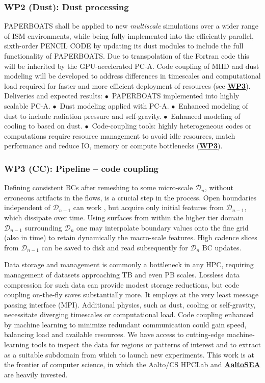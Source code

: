 \documentclass[a4paper,12pt]{article}
\newcommand{\wpdef}[3]{\hypertarget{wp#1}{\subsubsection*{WP#1 {\normalfont(#2)}: #3}}}
\newcommand{\wpref}[1]{\protect\hyperlink{wp#1}{\textbf{WP#1}}}
\begin{document}
\wpdef{2}{Dust}{Dust processing}
\vspace{-0.3cm}
\textsc{PAPERBOATS} shall be applied to new \textit{multiscale} simulations
over a wider range of ISM environments, while being fully implemented into the
efficiently parallel, sixth-order \textsc{PENCIL CODE} by updating its dust
modules to include the full functionality of \textsc{PAPERBOATS}. Due to
transpolation of the Fortran code this will be inherited by the GPU-accelerated PC-A.
Code coupling of MHD and dust modeling will be developed to address differences
in timescales and computational load required for faster and more efficient
deployment of resources (see \wpref{3}).
\tabto{0em}
Deliveries and expected results:
\tabto{0em}
$\bullet$~\textsc{PAPERBOATS} implemented into highly scalable PC-A.
\tabto{0em}
$\bullet$~Dust modeling applied with PC-A.
\tabto{0em}
$\bullet$~Enhanced modeling of dust to include radiation pressure and self-gravity.
\tabto{0em}
$\bullet$~Enhanced modeling of cooling to based on dust.
\tabto{0em}
$\bullet$~Code-coupling tools: highly heterogeneous codes or computations
require resource management to avoid idle resources, match performance and
reduce IO, memory or compute bottlenecks (\wpref{3}).

\wpdef{3}{CC}{Pipeline -- code coupling}
\vspace{-0.3cm}
Defining consistent BCs after remeshing to some micro-scale $\mathcal{D}_n$,
without erroneous artifacts in the flows, is a crucial step in the process.
Open boundaries independent of $\mathcal{D}_{n-1}$ can work \citep[][and paper
in preparation]{Aurora:2025}, but acquire only initial features from
$\mathcal{D}_{n-1}$, which dissipate over time.  Using surfaces from within the
higher tier domain $\mathcal{D}_{n-1}$ surrounding $\mathcal{D}_n$ one may
interpolate boundary values onto the fine grid (also in time) to retain
dynamically the macro-scale features.  High cadence slices from
$\mathcal{D}_{n-1}$ can be saved to disk and read subsequently for
$\mathcal{D}_{n}$ BC updates.

Data storage and management is commonly a bottleneck in any HPC, requiring
management of datasets approaching TB and even PB scales.  Lossless data
compression for such data can provide modest storage reductions, but code
coupling on-the-fly saves substantially more.  It employs at the very least
message passing interface (MPI).  Additional physics, such as dust, cooling or
self-gravity, necessitate diverging timescales or computational load.  Code
coupling enhanced by machine learning to minimize redundant communication could
gain speed, balancing load and available resources.  We have access to
cutting-edge machine-learning tools to inspect the data for regions or patterns
of interest and to extract as a suitable subdomain from which to launch new
experiments.  This work is at the frontier of computer science, in which the
Aalto/CS HPCLab and
\href{https://rdsea.github.io/}{\textbf{AaltoSEA}} are heavily invested.
\end{document}
